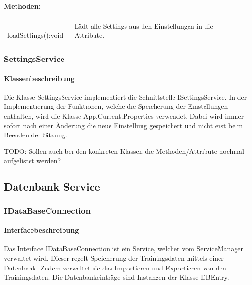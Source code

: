 \documentclass[a4paper,12pt]{article}
\begin{document}
	\paragraph{Methoden:}
	\begin{tabular}{p{7cm}p{10cm}}
		- loadSettings():void & Lädt alle Settings aus den Einstellungen in die Attribute.	
	\end{tabular}
\subsubsection{SettingsService}
	\paragraph{Klassenbeschreibung}
	Die Klasse SettingsService implementiert die Schnittstelle ISettingsService. In der Implementierung der Funktionen, welche die Speicherung der Einstellungen enthalten, wird die Klasse App.Current.Properties verwendet.
	Dabei wird immer sofort nach einer Änderung die neue Einstellung gespeichert und nicht erst beim Beenden der Sitzung.
	
	
	TODO: Sollen auch bei den konkreten Klassen die Methoden/Attribute nochmal aufgelistet werden?
\subsection{Datenbank Service}
\subsubsection{IDataBaseConnection}
	\paragraph{Interfacebeschreibung}
	Das Interface IDataBaseConnection ist ein Service, welcher vom ServiceManager verwaltet wird. Dieser regelt Speicherung der Trainingsdaten mittels einer \gls{Datenbank}. Zudem verwaltet sie das Importieren und Exportieren von den Trainingsdaten.
	Die Datenbankeinträge sind Instanzen der Klasse DBEntry. 
	
\end{document}
